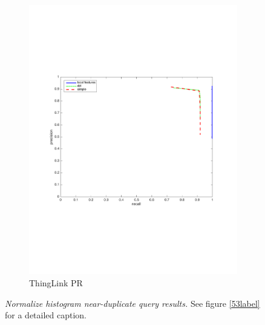 \documentclass[english,12pt,a4paper,pdftex,elec,utf8, table]{aaltothesis}
\begin{document}
\begin{figure}[htb]
\begin{center}
\begin{subfigure}[b]{0.49\textwidth}
    \includegraphics[width=\textwidth]{figures/thinglink_NormalizehistogramPR.pdf}
    \caption{ThingLink PR}
    \label{Normalizeprthinglink}
  \end{subfigure}
  \caption{\emph{Normalize histogram near-duplicate query results.} See figure \ref{53label} for a detailed caption. \label{histogramlabel}}
  \end{center}
\end{figure}
\end{document}
